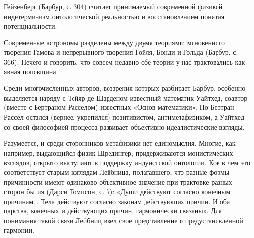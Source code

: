 Гейзенберг (Барбур,  с. 304)  считает принимаемый  современной физикой
индетерминизм  онтологической  реальностью и  восстановлением  понятия
потенциальности.

Современные  астрономы  разделены  между двумя  теориями:  мгновенного
творения Гамова и непрерывного творения Гойля, Бонди и Гольда (Барбур,
с.  366). Нечего  и  говорить, что  совсем недавно  обе  теории у  нас
трактовались как явная поповщина.

Среди  многочисленных  авторов,  воззрения которых  разбирает  Барбур,
особенно  выделяется наряду  с Тейяр  де Шарденом  известный математик
Уайтхед,  соавтор  (вместе  с  Бертраном  Расселом)  известных  «Основ
математики».   Но   Бертран   Рассел   остался   (вернее,   укрепился)
позитивистом, антиметафизиком, а Уайтхед  со своей философией процесса
развивает объективно идеалистические взгляды.

Разумеется, и  среди сторонников  метафизики нет  единомыслия. Многие,
как например, выдающийся физик Шредингер, придерживаются монистических
взглядов, открыто  выступают в поддержку индуистской  онтологии. Кое в
чем  это  соответствует  старым взглядам  Лейбница,  полагавшего,  что
разные  формы причинности  имеют  одинаково  объективное значение  при
трактовке разных сторон  бытия (Дарси Томпсон, с.  7): «Души действуют
согласно   конечным  причинам...   Тела  действуют   согласно  законам
действующих  причин. И  оба  царства, конечных  и действующих  причин,
гармонически  связаны». Для  понимания такой  связи Лейбниц  ввел свое
представление о предустановленной гармонии.

